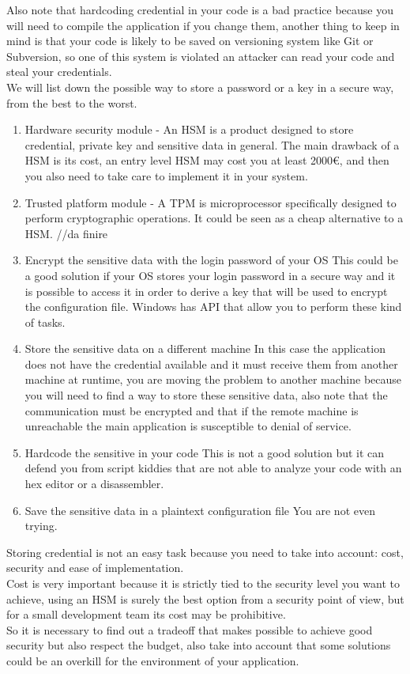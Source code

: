 Also note that hardcoding credential in your code is a bad practice because you will need to compile the application if you change them, another thing to keep in mind is that your code is likely to be saved on versioning system like Git or Subversion, so one of this system is violated an attacker can read your code and steal your credentials.\\

We will list down the possible way to store a password or a key in a secure way, from the best to the worst.\\
\begin{enumerate}
\item Hardware security module - An HSM is a product designed to store credential, private key and sensitive data in general.
The main drawback of a HSM is its cost, an entry level HSM may cost you at least 2000€, and then you also need to take care to implement it in your system.
\item Trusted platform module - A TPM is microprocessor specifically designed to perform cryptographic operations.
It could be seen as a cheap alternative to a HSM.
//da finire
\item Encrypt the sensitive data with the login password of your OS
This could be a good solution if your OS stores your login password in a secure way and it is possible to access it in order to derive a key that will be used to encrypt the configuration file.
Windows has API that allow you to perform these kind of tasks.
\item Store the sensitive data on a different machine
In this case the application does not have the credential available and it must receive them from another machine at runtime, you are moving the problem to another machine because you will need to find a way to store these sensitive data, also note that the communication must be encrypted and that if the remote machine is unreachable the main application is susceptible to denial of service.
\item Hardcode the sensitive in your code
This is not a good solution but it can defend you from script kiddies that are not able to analyze your code with an hex editor or a disassembler.
\item Save the sensitive data in a plaintext configuration file
You are not even trying.
\end{enumerate}

Storing credential is not an easy task because you need to take into account: cost, security and ease of implementation.\\
Cost is very important because it is strictly tied to the security level you want to achieve, using an HSM is surely the best option from a security point of view, but for a small development team its cost may be prohibitive.\\
So it is necessary to find out a tradeoff that makes possible to achieve good security but also respect the budget, also take into account that some solutions could be an overkill for the environment of your application.\\

